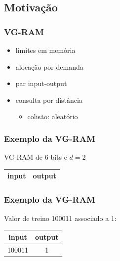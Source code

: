 \documentclass{beamer}
\begin{document}
\subsection{Motivação}
\begin{frame}
    \frametitle{VG-RAM}
    \begin{itemize}
        \item limites em memória
        \item alocação por demanda
        \item par input-output
        \item consulta por distância
            \begin{itemize}
                \item colisão: aleatório
            \end{itemize}
    \end{itemize}
\end{frame}
\begin{frame}
    \frametitle{Exemplo da VG-RAM}
    VG-RAM de 6 bits e $d = 2$
    \begin{table}
        \centering
        \begin{tabular}{|c|c|}
            \hline
            input & output\\
            \hline
        \end{tabular}
    \end{table}
\end{frame}
\begin{frame}
    \frametitle{Exemplo da VG-RAM}
    Valor de treino 100011 associado a 1:
    \begin{table}
        \centering
        \begin{tabular}{|c|c|}
            \hline
             input &   output\\
            \hline
            100011 & \alert 1\\
            \hline
        \end{tabular}
    \end{table}
\end{frame}
\end{document}
